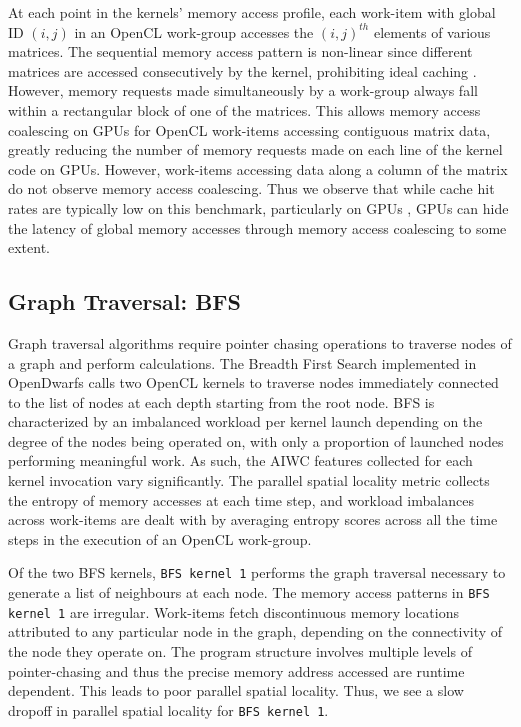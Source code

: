 \documentclass[review=false, sigchi]{acmart}
\begin{document}
	At each point in the kernels' memory access profile, each work-item with global ID $(i,j)$ in an OpenCL work-group accesses the $(i,j)^{th}$ elements of various matrices. The sequential memory access pattern is non-linear since different matrices are accessed consecutively by the kernel, prohibiting ideal caching \cite{krommydas2016opendwarfs}. However, memory requests made simultaneously by a work-group always fall within a rectangular block of one of the matrices. 
	This allows memory access coalescing on GPUs for OpenCL work-items accessing contiguous matrix data, greatly reducing the number of memory requests made on each line of the kernel code on GPUs. 
	However, work-items accessing data along a column of the matrix do not observe memory access coalescing.
	Thus we observe that while cache hit rates are typically low on this benchmark, particularly on GPUs \cite{krommydas2016opendwarfs}, GPUs can hide the latency of global memory accesses through memory access coalescing to some extent.
	
	\subsection{Graph Traversal: BFS}
	
	Graph traversal algorithms require pointer chasing operations to traverse nodes of a graph and perform calculations. 
	The Breadth First Search implemented in OpenDwarfs calls two OpenCL kernels to traverse nodes immediately connected to the list of nodes at each depth starting from the root node. 
	BFS is characterized by an imbalanced workload per kernel launch depending on the degree of the nodes being operated on, with only a proportion of launched nodes performing meaningful work. 
	As such, the AIWC features collected for each kernel invocation vary significantly. 
	The parallel spatial locality metric collects the entropy of memory accesses at each time step, and workload imbalances across work-items are dealt with by averaging entropy scores across all the time steps in the execution of an OpenCL work-group. 
	
	Of the two BFS kernels, \texttt{BFS kernel 1} performs the graph traversal necessary to generate a list of neighbours at each node. The memory access patterns in \texttt{BFS kernel 1} are irregular. 
	Work-items fetch discontinuous memory locations attributed to any particular node in the graph, depending on the connectivity of the node they operate on. 
	The program structure involves multiple levels of pointer-chasing and thus the precise memory address accessed are runtime dependent. 
	This leads to poor parallel spatial locality. Thus, we see a slow dropoff in parallel spatial locality for \texttt{BFS kernel 1}.
	
\end{document}
